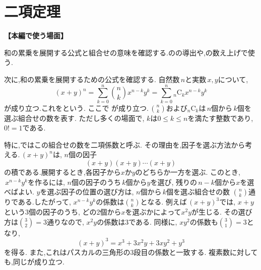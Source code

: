 
  \section{二項定理}\label{節：二項定理}
  \noindent\textbf{【本編で使う場面】}\par
  和の累乗を展開する公式と組合せの意味を確認する.のの導出や,の数え上げで使う.

    次に,和の累乗を展開するための公式を確認する.
    自然数$\,n$と実数$\,x,y$について,
    \[
      (x+y)^n=\sum_{k=0}^{n}\binom{n}{k}x^{n-k}y^{k}=\sum_{k=0}^{n}{}_n\mathrm{C}_kx^{n-k}y^{k}
    \]
    が成り立つ.これをという.
    ここで
\BookMathLayout{\[
      {}_n\mathrm{C}_k=\binom{n}{k}
      =\frac{n!}{k!(n-k)!}
      =\frac{n(n-1)\cdots(n-k+1)}{k!}
    \]}{
\[
\begin{aligned}
{}_n\mathrm C_k&=\binom nk=\frac{n!}{k!(n-k)!}\\
&=\frac{n(n-1)\cdots(n-k+1)}{k!}
\end{aligned}
\]
}
    が成り立つ.\,$\binom{n}{k}$および${}_n\mathrm{C}_k$は$\,n$個から$\,k$個を選ぶ組合せの数を表す.
    ただし多くの場面で,\,$\,k$は$0\le k\le n$を満たす整数であり,\,$0!=1$である.

    特に,ではこの組合せの数を二項係数と呼ぶ.
    その理由を,因子を選ぶ方法から考える.\,$(x+y)^n$は,\,$\,n$個の因子
    \[
      (x+y)(x+y)\cdots(x+y)
    \]
    の積である.展開するとき,各因子から$x$か$y$のどちらか一方を選ぶ.
    このとき,\,$\,x^{n-k}y^k$を作るには,\,$\,n$個の因子のうち$\,k$個から$y$を選び,
    残りの$\,n-k$個から$x$を選べばよい.
    $y$を選ぶ因子の位置の選び方は,\,$\,n$個から$\,k$個を選ぶ組合せの数
    $\binom{n}{k}$通りである.したがって,\,$\,x^{n-k}y^k$の係数は$\binom{n}{k}$となる.
    例えば$\,(x+y)^3$では,\,$\,x+y$という3個の因子のうち,
    どの2個から$x$を選ぶかによって$x^2y$が生じる.
    その選び方は$\binom{3}{2}=3$通りなので,\,$\,x^2y$の係数は$3$である.
    同様に,\,$\,xy^2$の係数も$\binom{3}{1}=3$となり,
    \[
      (x+y)^3=x^3+3x^2y+3xy^2+y^3
    \]
    を得る.
    また,これはパスカルの三角形の3段目の係数と一致する.
    複素数に対しても,同じが成り立つ.
